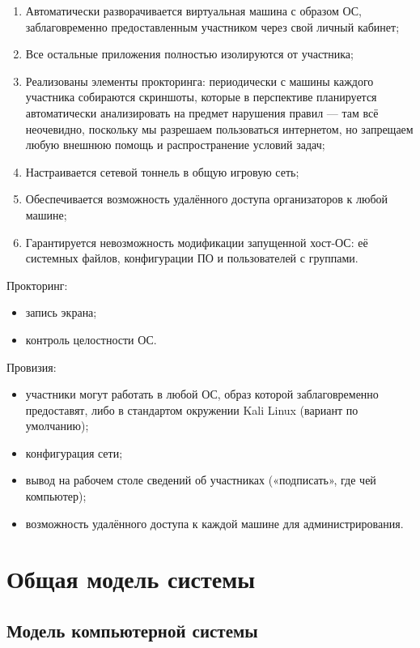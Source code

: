 \begin{enumerate}
\item Автоматически разворачивается виртуальная машина с образом ОС, заблаговременно предоставленным участником через свой личный кабинет;
\item Все остальные приложения полностью изолируются от участника;
\item Реализованы элементы прокторинга: периодически с машины каждого участника собираются скриншоты, которые в перспективе планируется автоматически анализировать на предмет нарушения правил — там всё неочевидно, поскольку мы разрешаем пользоваться интернетом, но запрещаем любую внешнюю помощь и распространение условий задач;
\item Настраивается сетевой тоннель в общую игровую сеть;
\item Обеспечивается возможность удалённого доступа организаторов к любой машине;
\item Гарантируется невозможность модификации запущенной хост-ОС: её системных файлов, конфигурации ПО и пользователей с группами.
\end{enumerate}

Прокторинг:
\begin{itemize}
\item
  запись экрана;
\item
  контроль целостности ОС.
\end{itemize}

Провизия:
\begin{itemize}
\item
  участники могут работать в любой ОС, образ которой заблаговременно предоставят, либо в стандартом окружении Kali Linux (вариант по умолчанию);
\item
  конфигурация сети;
\item
  вывод на рабочем столе сведений об участниках («подписать», где чей компьютер);
\item
  возможность удалённого доступа к каждой машине для администрирования.
\end{itemize}




\section{Общая модель системы}

\subsection{Модель компьютерной системы}

